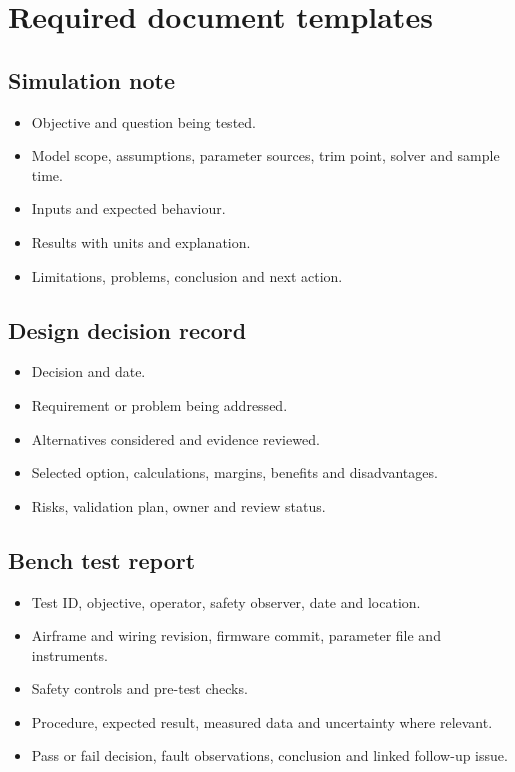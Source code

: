 \documentclass[11pt,a4paper]{article}
\begin{document}
\section{Required document templates}

\subsection{Simulation note}
\begin{itemize}
  \item Objective and question being tested.
  \item Model scope, assumptions, parameter sources, trim point, solver and sample time.
  \item Inputs and expected behaviour.
  \item Results with units and explanation.
  \item Limitations, problems, conclusion and next action.
\end{itemize}

\subsection{Design decision record}
\begin{itemize}
  \item Decision and date.
  \item Requirement or problem being addressed.
  \item Alternatives considered and evidence reviewed.
  \item Selected option, calculations, margins, benefits and disadvantages.
  \item Risks, validation plan, owner and review status.
\end{itemize}

\subsection{Bench test report}
\begin{itemize}
  \item Test ID, objective, operator, safety observer, date and location.
  \item Airframe and wiring revision, firmware commit, parameter file and instruments.
  \item Safety controls and pre-test checks.
  \item Procedure, expected result, measured data and uncertainty where relevant.
  \item Pass or fail decision, fault observations, conclusion and linked follow-up issue.
\end{itemize}
\end{document}
